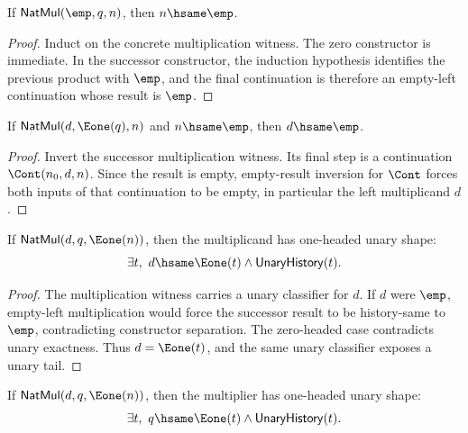 \begin{lemma}
\label{lem:natmul-empty-left-result-empty}
If \(\mathsf{NatMul}(\emp,q,n)\), then \(n\hsame\emp\).
\end{lemma}
\begin{proof}
Induct on the concrete multiplication witness. The zero constructor is
immediate. In the successor constructor, the induction hypothesis identifies
the previous product with \(\emp\), and the final continuation is therefore an
empty-left continuation whose result is \(\emp\).
\end{proof}
\begin{theorem}
\label{thm:natmul-succ-result-empty-left-empty}
If \(\mathsf{NatMul}(d,\Eone(q),n)\) and \(n\hsame\emp\), then \(d\hsame\emp\).
\end{theorem}
\begin{proof}
Invert the successor multiplication witness. Its final step is a continuation
\(\Cont(n_0,d,n)\). Since the result is empty, empty-result inversion for
\(\Cont\) forces both inputs of that continuation to be empty, in particular
the left multiplicand \(d\).
\end{proof}
\begin{theorem}
\label{thm:natmul-successor-result-multiplicand-positive-shape}
If $\mathsf{NatMul}(d,q,\Eone(n))$, then the multiplicand has one-headed
unary shape:
$$
\exists t,\ d\hsame\Eone(t)\wedge\mathsf{UnaryHistory}(t).
$$
\end{theorem}
\begin{proof}
The multiplication witness carries a unary classifier for $d$. If $d$ were
$\emp$, empty-left multiplication would force the successor result to be
history-same to $\emp$, contradicting constructor separation. The zero-headed
case contradicts unary exactness. Thus $d=\Eone(t)$, and the same unary
classifier exposes a unary tail.
\end{proof}
\begin{theorem}
\label{thm:natmul-successor-result-multiplier-positive-shape}
If $\mathsf{NatMul}(d,q,\Eone(n))$, then the multiplier has one-headed unary
shape:
$$
\exists t,\ q\hsame\Eone(t)\wedge\mathsf{UnaryHistory}(t).
$$
\end{theorem}

